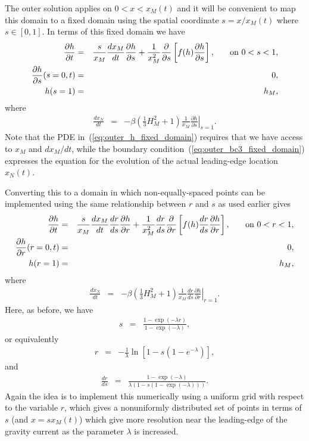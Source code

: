 \documentclass[11pt]{article}
\newcommand{\bea}{\begin{eqnarray}}
\newcommand{\eea}{\end{eqnarray}}
\begin{document}
The outer solution applies on $0 < x < x_M(t)$ and it will be convenient to map this domain to a fixed domain using the spatial coordinate $s=x/x_M(t)$ where $s \in [0,1]$.  In terms of this fixed domain we have
\bea
\label{eq:outer_h_fixed_domain}
\frac{\partial h}{\partial t} & = & \frac{s}{x_M} \frac{dx_M}{dt} \frac{\partial h}{\partial s} + \frac{1}{x_M^2} \frac{\partial}{\partial s} \left[ f(h)\frac{\partial h}{\partial s} \right], \hspace{0.25in} \mbox{on $0 < s < 1$},\\
\label{eq:outer_bc1_fixed_domain}
\frac{\partial h}{\partial s}(s=0,t) & = & 0,\\
\label{eq:outer_bc2_fixed_domain}
h(s=1) & = & h_M,
\eea
where
\bea
\label{eq:outer_bc3_fixed_domain}
\frac{dx_N}{dt} & = & - \beta \left( \frac{1}{3} H^2_M + 1 \right) \frac{1}{x_M} \left. \frac{\partial h}{\partial s} \right|_{s=1}.
\eea
Note that the PDE in~(\ref{eq:outer_h_fixed_domain}) requires that we have access to $x_M$ and $dx_M/dt$, while the boundary condition~(\ref{eq:outer_bc3_fixed_domain}) 
expresses the equation for the evolution of the actual leading-edge location $x_N(t)$.

Converting this to a domain in which non-equally-spaced points can be implemented using the same relationship between $r$ and $s$ as used earlier gives
\bea
\label{eq:outer_h_fixed_domain_drds}
\frac{\partial h}{\partial t} & = & \frac{s}{x_M} \frac{dx_M}{dt} \frac{dr}{ds} \frac{\partial h}{\partial r} + \frac{1}{x_M^2} \frac{dr}{ds} \frac{\partial}{\partial r} 
\left[ f(h) \frac{dr}{ds} \frac{\partial h}{\partial r} \right], \hspace{0.25in} \mbox{on $0 < r < 1$},\\
\label{eq:outer_bc1_fixed_domain_drds}
\frac{\partial h}{\partial r}(r=0,t) & = & 0,\\
\label{eq:outer_bc2_fixed_domain_drds}
h(r=1) & = & h_M,
\eea
where
\bea
\label{eq:outer_bc3_fixed_domain_drds}
\frac{dx_N}{dt} & = & - \beta \left( \frac{1}{3} H^2_M + 1 \right)  \frac{1}{x_M} \frac{dr}{ds} \left. \frac{\partial h}{\partial r} \right|_{r=1}.
\eea
Here, as before, we have
\bea
s & = & \frac{1- \exp (-\lambda r)}{1 - \exp (-\lambda)},
\eea
or equivalently
\bea
r & = & - \frac{1}{\lambda} \ln \left[ 1 - s (1-e^{-\lambda}) \right],
\eea
and
\bea
\frac{dr}{ds} & = & \frac{ 1 - \exp(-\lambda) } {\lambda  (1 - s(1 - \exp(-\lambda)))}.
\eea
Again the idea is to implement this numerically using a uniform grid with respect to the variable $r$, which gives a nonuniformly distributed set of points in terms of
$s$ (and $x= s x_M(t)$) which give more resolution near the leading-edge of the gravity current as the parameter $\lambda$ is increased.
\end{document}
